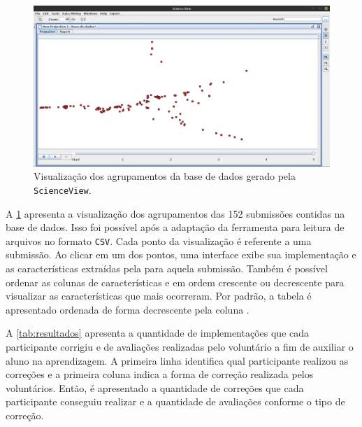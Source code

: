 		\begin{figure}[b]
			\centering
			\includegraphics[width=1\linewidth]{imagem/projecaoFinal}
			\caption[Visualização da projeção da base de dados gerado pela \texttt{ScienceView}]
			{Visualização dos agrupamentos da base de dados gerado pela \texttt{ScienceView}.}
			\label{fig:projecaoFinal}
		\end{figure}

		A \cref{fig:projecaoFinal} apresenta a visualização dos agrupamentos das 152
		submissões contidas na base de dados. Isso foi possível após a adaptação da
		ferramenta para leitura de arquivos no formato \texttt{CSV}. Cada ponto da
		visualização é referente a uma submissão. Ao clicar em um dos pontos,
		uma interface exibe sua implementação e as características extraídas pela
		 para aquela submissão. Também é possível ordenar
		as colunas de características  e  em
		ordem  crescente ou decrescente para visualizar as características que mais
		ocorreram. Por padrão, a tabela é apresentado ordenada de forma decrescente
		pela coluna .
		
		A \cref{tab:resultados} apresenta a quantidade de implementações que cada
		participante corrigiu e de avaliações realizadas pelo voluntário a fim de
		auxiliar o aluno na aprendizagem. A primeira linha identifica
		qual participante realizou as correções e a primeira coluna indica a forma
		de correção realizada pelos voluntários. Então, é apresentado a quantidade
		de correções que cada participante conseguiu realizar e a quantidade de
		avaliações conforme o tipo de correção.
		
